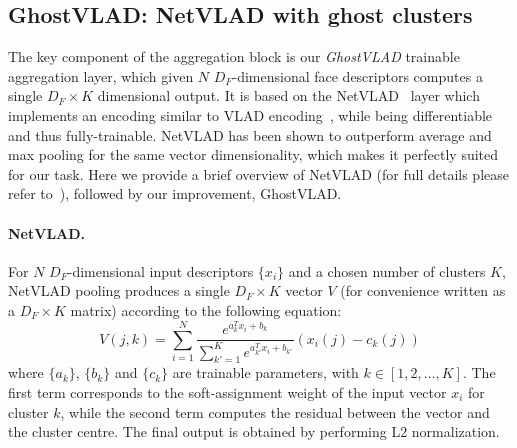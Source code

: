 \documentclass[runningheads]{llncs}
\begin{document}
\subsection{GhostVLAD: NetVLAD with ghost clusters} \label{sec:ghost}
The key component of the aggregation block is our \emph{GhostVLAD}
trainable aggregation layer, which given $N$ $D_F$-dimensional face descriptors computes a single $D_F \times K$ dimensional output.
It is based on the NetVLAD~\cite{Arandjelovic16} layer
which implements an encoding similar to 
VLAD encoding~\cite{Jegou10}, while being 
differentiable and thus fully-trainable.
NetVLAD  has been shown to outperform average and max pooling for the same
vector dimensionality, which makes
it perfectly suited for our task.
Here we provide a brief overview of NetVLAD
(for full details please refer to~\cite{Arandjelovic16}),
followed by our improvement, GhostVLAD.

\paragraph{NetVLAD.}
For $N$ $D_F$-dimensional input descriptors $\{x_i\}$ and
a chosen number of clusters $K$, NetVLAD pooling produces a single $D_F \times K$
vector $V$ (for convenience written as a $D_F \times K$ matrix) according
to the following equation:
%
\begin{equation}
V(j,k) = \sum_{i=1}^{N} \frac{e^{a_k^Tx_i + b_k}}{\sum_{k'=1}^{K}{e^{a_{k'}^Tx_i + b_{k'}}}} (x_i(j) - c_k(j))
\label{eq:netvlad}
\end{equation}
%
where $\{a_k\}$, $\{b_k\}$ and $\{c_k\}$ are trainable parameters, with $k \in [1, 2, \dots, K]$.
The first term corresponds to the soft-assignment weight
of the input vector $x_i$ for cluster $k$,
while the second term computes the residual between the vector and
the cluster centre.
The final output is obtained by performing L2 normalization.
\end{document}
